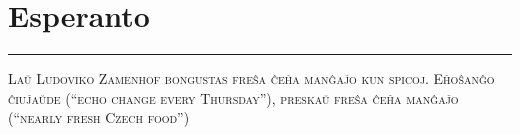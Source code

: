 \vspace{-1em}\section*{\checkno Esperanto}
\vspace{-.5em}\hrule\vspace{.5em}
\noindent\textsc{Laŭ Ludoviko Zamenhof bongustas freŝa ĉeĥa manĝaĵo kun spicoj.
Eĥoŝanĝo ĉiuĵaŭde (“echo change every Thursday”), 
preskaŭ freŝa ĉeĥa manĝaĵo (“nearly fresh Czech food”)
}
